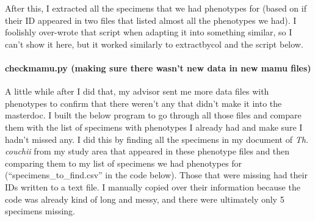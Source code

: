 \documentclass[
]{article}
\begin{document}
After this, I extracted all the specimens that we had phenotypes for
(based on if their ID appeared in two files that listed almost all the
phenotypes we had). I foolishly over-wrote that script when adapting it
into something similar, so I can't show it here, but it worked similarly
to extractbycol and the script below.

\hypertarget{checkmamu.py-making-sure-there-wasnt-new-data-in-new-mamu-files}{%
\paragraph{checkmamu.py (making sure there wasn't new data in new mamu
files)}\label{checkmamu.py-making-sure-there-wasnt-new-data-in-new-mamu-files}}

A little while after I did that, my advisor sent me more data files with
phenotypes to confirm that there weren't any that didn't make it into
the masterdoc. I built the below program to go through all those files
and compare them with the list of specimens with phenotypes I already
had and make sure I hadn't missed any. I did this by finding all the
specimens in my document of \emph{Th. couchii} from my study area that
appeared in these phenotype files and then comparing them to my list of
specimens we had phenotypes for (``specimens\_to\_find.csv'' in the code
below). Those that were missing had their IDs written to a text file. I
manually copied over their information because the code was already kind
of long and messy, and there were ultimately only 5 specimens missing.
\end{document}

